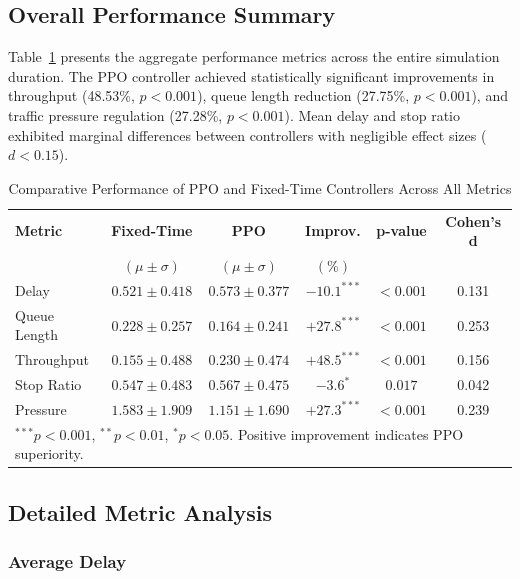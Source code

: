 \documentclass[11pt, a4paper]{report}
\begin{document}
\subsection{Overall Performance Summary}

Table~\ref{tab:overall_results} presents the aggregate performance metrics across the entire simulation duration. The PPO controller achieved statistically significant improvements in throughput (48.53\%, $p < 0.001$), queue length reduction (27.75\%, $p < 0.001$), and traffic pressure regulation (27.28\%, $p < 0.001$). Mean delay and stop ratio exhibited marginal differences between controllers with negligible effect sizes ($d < 0.15$).

\begin{table}[H]
\centering
\caption{Comparative Performance of PPO and Fixed-Time Controllers Across All Metrics}
\label{tab:overall_results}
\begin{tabular}{lccccc}
\toprule
\textbf{Metric} & \textbf{Fixed-Time} & \textbf{PPO} & \textbf{Improv.} & \textbf{p-value} & \textbf{Cohen's d} \\
 & $(\mu \pm \sigma)$ & $(\mu \pm \sigma)$ & $(\%)$ & & \\
\midrule
Delay & $0.521 \pm 0.418$ & $0.573 \pm 0.377$ & $-10.1^{***}$ & $<0.001$ & 0.131 \\
Queue Length & $0.228 \pm 0.257$ & $0.164 \pm 0.241$ & $+27.8^{***}$ & $<0.001$ & 0.253 \\
Throughput & $0.155 \pm 0.488$ & $0.230 \pm 0.474$ & $+48.5^{***}$ & $<0.001$ & 0.156 \\
Stop Ratio & $0.547 \pm 0.483$ & $0.567 \pm 0.475$ & $-3.6^{*}$ & $0.017$ & 0.042 \\
Pressure & $1.583 \pm 1.909$ & $1.151 \pm 1.690$ & $+27.3^{***}$ & $<0.001$ & 0.239 \\
\bottomrule
\multicolumn{6}{l}{\footnotesize $^{***}p<0.001$, $^{**}p<0.01$, $^{*}p<0.05$. Positive improvement indicates PPO superiority.}
\end{tabular}
\end{table}

\subsection{Detailed Metric Analysis}

\subsubsection{Average Delay}
\end{document}
